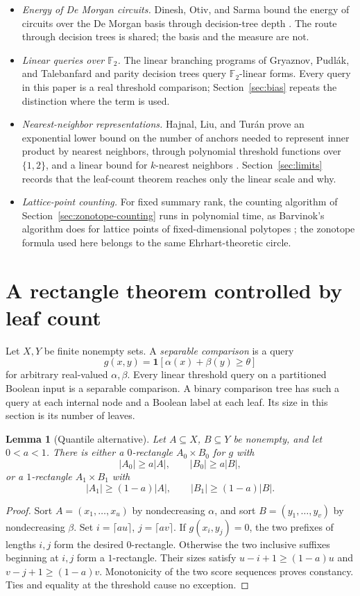 \documentclass[11pt]{article}
\newtheorem{lemma}[theorem]{Lemma}
\theoremstyle{definition}
\newcommand{\F}{\mathbb F}
\newcommand{\ind}[1]{\mathbf 1[#1]}
\begin{document}
\begin{itemize}
 \item \emph{Energy of De Morgan circuits.} Dinesh, Otiv, and Sarma bound the energy of circuits over the De Morgan basis through decision-tree depth \cite{DOS20}. The route through decision trees is shared; the basis and the measure are not.
 \item \emph{Linear queries over \(\F_2\).} The linear branching programs of Gryaznov, Pudl\'ak, and Talebanfard \cite{GPT22} and parity decision trees query \(\F_2\)-linear forms. Every query in this paper is a real threshold comparison; Section~\ref{sec:bias} repeats the distinction where the term is used.
 \item \emph{Nearest-neighbor representations.} Hajnal, Liu, and Tur\'an prove an exponential lower bound on the number of anchors needed to represent inner product by nearest neighbors, through polynomial threshold functions over \(\{1,2\}\), and a linear bound for \(k\)-nearest neighbors \cite{HLT22}. Section~\ref{sec:limits} records that the leaf-count theorem reaches only the linear scale and why.
 \item \emph{Lattice-point counting.} For fixed summary rank, the counting algorithm of Section~\ref{sec:zonotope-counting} runs in polynomial time, as Barvinok's algorithm does for lattice points of fixed-dimensional polytopes \cite{Barvinok94}; the zonotope formula used here belongs to the same Ehrhart-theoretic circle.
\end{itemize}

\section{A rectangle theorem controlled by leaf count}\label{sec:leaf}
Let \(X,Y\) be finite nonempty sets. A \emph{separable comparison} is a query
\[
 g(x,y)=\ind{\alpha(x)+\beta(y)\ge\theta}
\]
for arbitrary real-valued \(\alpha,\beta\). Every linear threshold query on a partitioned Boolean input is a separable comparison. A binary comparison tree has such a query at each internal node and a Boolean label at each leaf. Its size in this section is its number of leaves.

\begin{lemma}[Quantile alternative]\label{lem:quantile}
Let \(A\subseteq X\), \(B\subseteq Y\) be nonempty, and let \(0<a<1\).
There is either a \(0\)-rectangle \(A_0\times B_0\) for \(g\) with
\[
 |A_0|\ge a|A|,\qquad |B_0|\ge a|B|,
\]
or a \(1\)-rectangle \(A_1\times B_1\) with
\[
 |A_1|\ge(1-a)|A|,\qquad |B_1|\ge(1-a)|B|.
\]
\end{lemma}
\begin{proof}
Sort \(A=(x_1,\ldots,x_u)\) by nondecreasing \(\alpha\), and sort \(B=(y_1,\ldots,y_v)\) by nondecreasing \(\beta\). Set \(i=\lceil au\rceil\), \(j=\lceil av\rceil\).
If \(g(x_i,y_j)=0\), the two prefixes of lengths \(i,j\) form the desired \(0\)-rectangle.
Otherwise the two inclusive suffixes beginning at \(i,j\) form a \(1\)-rectangle. Their sizes satisfy \(u-i+1\ge(1-a)u\) and \(v-j+1\ge(1-a)v\).
Monotonicity of the two score sequences proves constancy. Ties and equality at the threshold cause no exception.
\end{proof}
\end{document}
